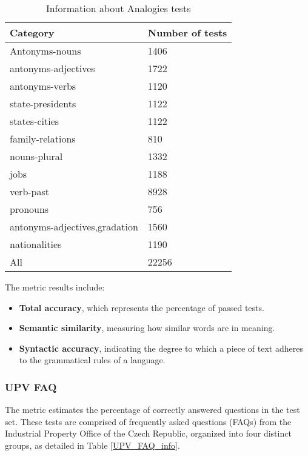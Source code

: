 \documentclass{article}
\begin{document}
\begin{table}[h]
  \centering
  \begin{tabular}{ |p{4.66cm}|p{2.6cm}|  }
    \hline
    Category                      & Number of tests \\
    \hline
    Antonyms-nouns                & 1406            \\
    antonyms-adjectives           & 1722            \\
    antonyms-verbs                & 1120            \\
    state-presidents              & 1122            \\
    states-cities                 & 1122            \\
    family-relations              & 810             \\
    nouns-plural                  & 1332            \\
    jobs                          & 1188            \\
    verb-past                     & 8928            \\
    pronouns                      & 756             \\
    antonyms-adjectives,gradation & 1560            \\
    nationalities                 & 1190            \\
    \hline
    \hline
    All                           & 22256           \\ 
    \hline
  \end{tabular}
  \caption{Information about Analogies tests}
  \label{embedding_evaluator_info}
\end{table}

\newpage

The metric results include:
\begin{itemize}
  \item \textbf{Total accuracy}, which represents the percentage of passed tests.
  \item \textbf{Semantic similarity}, measuring how similar words are in meaning.
  \item \textbf{Syntactic accuracy}, indicating the degree to which a piece of text adheres to the grammatical rules of a language.
  \end{itemize}

\subsubsection[]{UPV FAQ \cite{upv_faq}}
The metric estimates the percentage of correctly answered questions in the test set.
These tests are comprised of frequently asked questions (FAQs) from the Industrial Property Office of the Czech Republic, organized into four distinct groups, as detailed in Table \ref{UPV_FAQ_info}.
\end{document}
